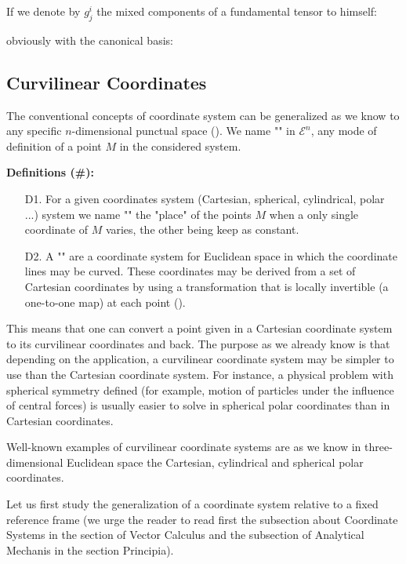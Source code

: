 	If we denote by $g_j^i$ the mixed components of a fundamental tensor to himself:
	
	obviously with the canonical basis:	
	
	
	\subsection{Curvilinear Coordinates}
	The conventional concepts of coordinate system can be generalized as we know to any specific $n$-dimensional punctual space (). We name "" in $\mathcal{E}^n$, any mode of definition of a point $M$ in the considered system.
	
	\textbf{Definitions (\#\mydef):} 
	\begin{enumerate}
		\item[D1.] For a given coordinates system (Cartesian, spherical, cylindrical, polar ...) system we name "" the "place" of the points $M$ when a only single coordinate of $M$ varies, the other being keep as constant.

		\item[D2.] A "\label{curvilinear coordinates tensor calculus}" are a coordinate system for Euclidean space in which the coordinate lines may be curved. These coordinates may be derived from a set of Cartesian coordinates by using a transformation that is locally invertible (a one-to-one map) at each point ().
	\end{enumerate}
	 This means that one can convert a point given in a Cartesian coordinate system to its curvilinear coordinates and back. The purpose as we already know is that depending on the application, a curvilinear coordinate system may be simpler to use than the Cartesian coordinate system. For instance, a physical problem with spherical symmetry defined (for example, motion of particles under the influence of central forces) is usually easier to solve in spherical polar coordinates than in Cartesian coordinates.
	 
	 Well-known examples of curvilinear coordinate systems are as we know in three-dimensional Euclidean space the Cartesian, cylindrical and spherical polar coordinates.
	 
	 Let us first study the generalization of a coordinate system relative to a fixed reference frame (we urge the reader to read first the subsection about Coordinate Systems in the section of Vector Calculus and the subsection of Analytical Mechanis in the section Principia).
	 
